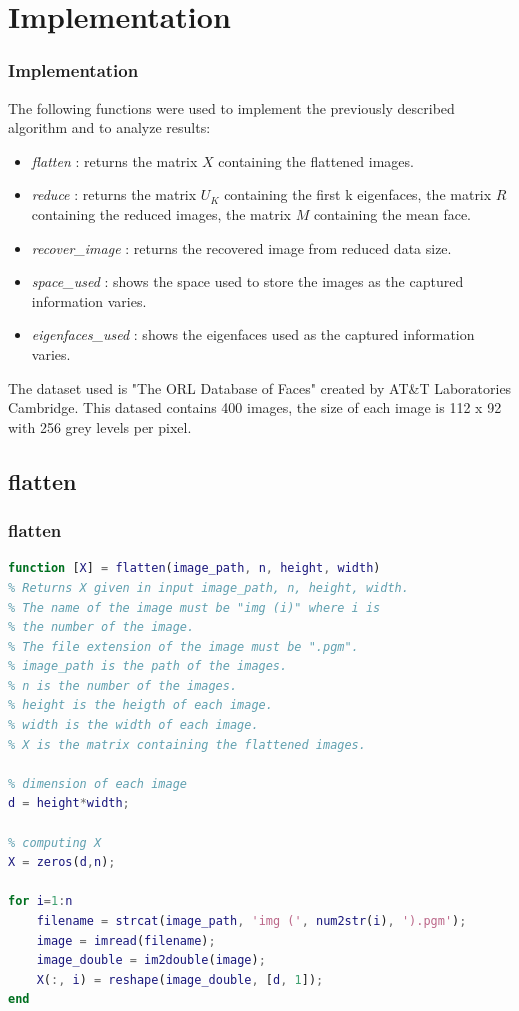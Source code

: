 \documentclass[10pt]{beamer}
\begin{document}
\section{Implementation}
\begin{frame}
    \frametitle{Implementation}
    The following functions were used to implement the previously described algorithm and to analyze results:

    \begin{itemize}
        \item \textit{flatten} : returns the matrix $ X $ containing the flattened images.
        \item \textit{reduce} : returns the matrix $ U_K $ containing the first k eigenfaces, the matrix $ R $ containing the reduced images, the matrix $ M $ containing the mean face.
        \item \textit{recover\_image} : returns the recovered image from reduced data size.
        \item \textit{space\_used} : shows the space used to store the images as the captured information varies.
        \item \textit{eigenfaces\_used} : shows the eigenfaces used as the captured information varies.
    \end{itemize}
    
    The dataset used is "The ORL Database of Faces" created by AT\&T Laboratories Cambridge. This datased contains 400 images, the size of each image is 112 x 92 with 256 grey levels per pixel.

\end{frame}

\subsection{flatten}
\begin{frame}[fragile]
    \frametitle{flatten}
    
    \begin{lstlisting}[language=Matlab, numbers=none]
function [X] = flatten(image_path, n, height, width)
% Returns X given in input image_path, n, height, width.
% The name of the image must be "img (i)" where i is 
% the number of the image.
% The file extension of the image must be ".pgm".
% image_path is the path of the images. 
% n is the number of the images.
% height is the heigth of each image.
% width is the width of each image.
% X is the matrix containing the flattened images.
 
% dimension of each image
d = height*width;

% computing X
X = zeros(d,n);

for i=1:n
    filename = strcat(image_path, 'img (', num2str(i), ').pgm');
    image = imread(filename);
    image_double = im2double(image);
    X(:, i) = reshape(image_double, [d, 1]);
end
    \end{lstlisting}

\end{frame}
\end{document}
